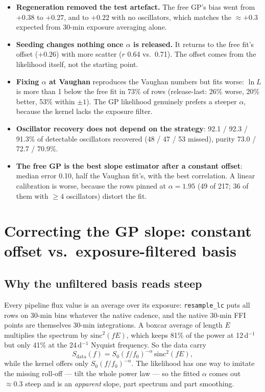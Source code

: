 \documentclass[11pt]{article}
\newcommand{\code}[1]{\texttt{#1}}
\begin{document}
\begin{itemize}
\item \textbf{Regeneration removed the test artefact.} The free GP's bias went from $+0.38$
  to $+0.27$, and to $+0.22$ with no oscillators, which matches the $\approx+0.3$
  expected from 30-min exposure averaging alone.
\item \textbf{Seeding changes nothing once $\alpha$ is released.} It returns to the free
  fit's offset ($+0.26$) with more scatter ($r$ 0.64 vs.\ 0.71). The offset comes from the
  likelihood itself, not the starting point.
\item \textbf{Fixing $\alpha$ at Vaughan} reproduces the Vaughan numbers but fits worse:
  $\ln L$ is more than 1 below the free fit in 73\% of rows (release-last: 26\% worse,
  20\% better, 53\% within $\pm1$). The GP likelihood genuinely prefers a steeper
  $\alpha$, because the kernel lacks the exposure filter.
\item \textbf{Oscillator recovery does not depend on the strategy}: 92.1 / 92.3 /
  91.3\% of detectable oscillators recovered (48 / 47 / 53 missed), purity 73.0 / 72.7 /
  70.9\%.
\item \textbf{The free GP is the best slope estimator after a constant offset}: median
  error 0.10, half the Vaughan fit's, with the best correlation. A linear calibration is
  worse, because the rows pinned at $\alpha=1.95$ (49 of 217; 36 of them with $\geq4$
  oscillators) distort the fit.
\end{itemize}

\section{Correcting the GP slope: constant offset vs.\ exposure-filtered basis}

\subsection{Why the unfiltered basis reads steep}

Every pipeline flux value is an average over its exposure: \code{resample\_lc} puts all rows
on 30-min bins whatever the native cadence, and the native 30-min FFI points are themselves
30-min integrations. A boxcar average of length $E$ multiplies the spectrum by
$\mathrm{sinc}^2(fE)$, which keeps 81\% of the power at 12\,d$^{-1}$ but only 41\% at the
24\,d$^{-1}$ Nyquist frequency. So the data carry
\begin{equation}
S_\mathrm{data}(f) = S_0 (f/f_0)^{-\alpha}\,\mathrm{sinc}^2(fE),
\end{equation}
while the kernel offers only $S_0 (f/f_0)^{-\alpha}$. The likelihood has one way to imitate
the missing roll-off --- tilt the whole power law --- so the fitted $\alpha$ comes out
$\approx0.3$ steep and is an \emph{apparent} slope, part spectrum and part smoothing.
\end{document}
